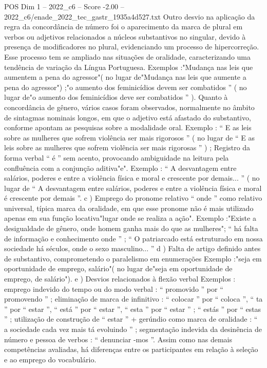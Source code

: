 \begin{textsample}{POS Dim 1 – 2022\_c6 – Score -2.00 – 2022\_c6/enade\_2022\_tec\_gastr\_1935a4d527.txt}
Outro desvio na aplicação da regra da concordância de número foi o aparecimento da marca de plural em verbos ou adjetivos relacionados a núcleos substantivos no singular, devido à presença de modificadores no plural, evidenciando um processo de hipercorreção.
Esse processo tem se ampliado nas situações de oralidade, caracterizando uma tendência de variação da Língua Portuguesa.
Exemplos :"Mudança nas leis que aumentem a pena do agressor"( no lugar de"Mudança nas leis que aumente a pena do agressor") ;"o aumento dos feminicídios devem ser combatidos ” ( no lugar de"o aumento dos feminicídios deve ser combatidos ” ).
Quanto à concordância de gênero, vários casos foram observados, normalmente no âmbito de sintagmas nominais longos, em que o adjetivo está afastado do substantivo, conforme apontam as pesquisas sobre a modalidade oral.
Exemplo : “ E as leis sobre as mulheres que sofrem violência ser mais rigorosos ” ( no lugar de “ E as leis sobre as mulheres que sofrem violência ser mais rigorosas ” ) ; Registro da forma verbal “ é ” sem acento, provocando ambiguidade na leitura pela confluência com a conjunção aditiva"e".
Exemplo : “ A desvantagem entre salários, poderes e entre a violência física e moral e crescente por demais... ” ( no lugar de “ A desvantagem entre salários, poderes e entre a violência física e moral é crescente por demais ”. c ) Emprego do pronome relativo “ onde ” como relativo universal, típica marca da oralidade, em que esse pronome não é mais utilizado apenas em sua função locativa"lugar onde se realiza a ação".
Exemplo :"Existe a desigualdade de gênero, onde homem ganha mais do que as mulheres"; “ há falta de informação e conhecimento onde ” ; “ O patriarcado está estruturado em nossa sociedade há séculos, onde o sexo masculino... ” d ) Falta de artigo definido antes de substantivo, comprometendo o paralelismo em enumerações Exemplo :"seja em oportunidade de emprego, salário"( no lugar de"seja em oportunidade de emprego, de salário"). e ) Desvios relacionados à flexão verbal Exemplos : emprego indevido do tempo ou do modo verbal : “ promovido ” por “ promovendo ” ; eliminação de marca de infinitivo : “ colocar ” por “ coloca ”, “ ta ” por “ estar ”, “ está ” por “ estar ”, “ esta ” por “ estar ” ; “ estás ” por “ estas ” ; utilização de construção de “ estar ” + gerúndio como marca de oralidade : “ a sociedade cada vez mais tá evoluindo ” ; segmentação indevida da desinência de número e pessoa de verbos : “ denunciar -mos ”.
Assim como nas demais competências avaliadas, há diferenças entre os participantes em relação à seleção e ao emprego do vocabulário.

\end{textsample}
